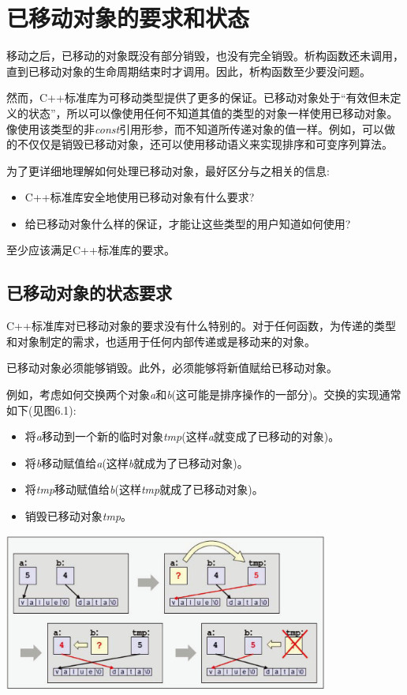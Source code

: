 \section{已移动对象的要求和状态}
移动之后，已移动的对象既没有部分销毁，也没有完全销毁。析构函数还未调用，直到已移动对象的生命周期结束时才调用。因此，析构函数至少要没问题。

然而，C++标准库为可移动类型提供了更多的保证。已移动对象处于“有效但未定义的状态”，所以可以像使用任何不知道其值的类型的对象一样使用已移动对象。像使用该类型的非\textit{const}引用形参，而不知道所传递对象的值一样。例如，可以做的不仅仅是销毁已移动对象，还可以使用移动语义来实现排序和可变序列算法。

为了更详细地理解如何处理已移动对象，最好区分与之相关的信息:

\begin{itemize}
	\item C++标准库安全地使用已移动对象有什么要求?
	\item 给已移动对象什么样的保证，才能让这些类型的用户知道如何使用?
\end{itemize}

至少应该满足C++标准库的要求。

\subsection{已移动对象的状态要求}

C++标准库对已移动对象的要求没有什么特别的。对于任何函数，为传递的类型和对象制定的需求，也适用于任何内部传递或是移动来的对象。

已移动对象必须能够销毁。此外，必须能够将新值赋给已移动对象。

例如，考虑如何交换两个对象\textit{a}和\textit{b}(这可能是排序操作的一部分)。交换的实现通常如下(见图6.1):

\begin{itemize}
	\item 将\textit{a}移动到一个新的临时对象\textit{tmp}(这样\textit{a}就变成了已移动的对象)。
	\item 将\textit{b}移动赋值给\textit{a}(这样\textit{b}就成为了已移动对象)。
	\item 将\textit{tmp}移动赋值给\textit{b}(这样\textit{tmp}就成了已移动对象)。
	\item 销毁已移动对象\textit{tmp}。
\end{itemize}

\begin{center}
	\includegraphics[width=0.8\textwidth]{part1/ch6/images/1}
\end{center}

